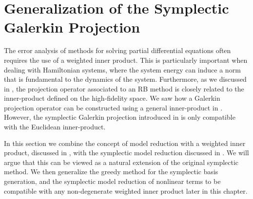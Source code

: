 \section{Generalization of the Symplectic Galerkin Projection} \label{sec:normmor.1}

The error analysis of methods for solving partial differential equations often requires the use of a weighted inner product. This is particularly important when dealing with Hamiltonian systems, where the system energy can induce a norm that is fundamental to the dynamics of the system. Furthermore, as we discussed in , the projection operator associated to an RB method is closely related to the inner-product defined on the high-fidelity space. We saw how a Galerkin projection operator can be constructed using a general inner-product in . However, the symplectic Galerkin projection introduced in  is only compatible with the Euclidean inner-product.

In this section we combine the concept of model reduction with a weighted inner product, discussed in , with the symplectic model reduction discussed in . We will argue that this can be viewed as a natural extension of the original symplectic method. We then generalize the greedy method for the symplectic basis generation, and the symplectic model reduction of nonlinear terms to be compatible with any non-degenerate weighted inner product later in this chapter.

